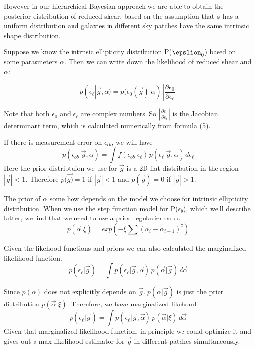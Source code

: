 \documentclass[useAMS,usenatbib]{mn2e}
\begin{document}
However in our hierarchical Bayesian approach we are able to obtain
the posterior distribution of reduced shear, based on the assumption that $\phi$ has
a uniform distribution and galaxies in different sky patches have
the same intrinsic shape distribution.

Suppose we know the intrnsic ellipticity distribution P($\epslion_{0}$)
based on some parasmeters $\alpha$. Then we can write down the likelihood
of reduced shear and $\alpha$:

\begin{equation}
p(\epsilon_{\ell}|\vec{g},\alpha)=p(\epsilon_{0}(\vec{g})|\alpha)\,|\frac{\partial\epsilon_{0}}{\partial\epsilon_{\ell}}|
\end{equation}



Note that both $\epsilon_{0}$ and $\epsilon_{\ell}$ are complex numbers. So
$|\frac{\partial\epsilon_{0}}{\partial\epsilon_{\ell}}|$ is the Jacobian
determinant term, which is calculated numerically from formula
(5).

If there is measurement error on $\epsilon_{ob}$, we will have 
\begin{equation}
p(\epsilon_{ob}|\vec{g},\alpha)=\int f(\epsilon_{ob}|\epsilon_{\ell})\, p(\epsilon_{\ell}|\vec{g},\alpha)\,d\epsilon_{\ell}
\end{equation}
Here the prior distribtuion we use for $\vec{g}$ is a 2D flat distribution
in the region $|\vec{g}|<1$. Therefore $p(\vec{g)}=1$ if $|\vec{g}|<1$
and $p(\vec{g})=0$ if $|\vec{g}|>1$.

The prior of $\alpha$ some how depends on the model we choose for
intrinsic ellipticity distribution. When we use the step function
model for P($\epsilon_{0}$), which we'll describe latter, we find that
we need to use a prior regulazier on $\alpha$. 
\begin{equation}
p(\vec{\alpha}|\xi)=exp(-\xi\sum(\alpha_{i}-\alpha_{i-1})^{2})
\end{equation}

Given the likehood functions and priors we can also calculated the marginalized likelihood function. 
\begin{equation}
p(\epsilon_{\ell}|\vec{g})=\int p(\epsilon_{\ell}|\vec{g},\vec{\alpha})\,p(\vec{\alpha}|\vec{g})\,d\vec{\alpha}
\end{equation}

Since $p(\alpha)$ does not explicitly depends on $\vec{g}$. $p(\alpha|\vec{g})$ is
just the prior distribution $p(\vec{\alpha}|\xi)$. Therefore, we have
marginalized likehood 
\begin{equation}
p(\epsilon_{\ell}|\vec{g})=\int p(\epsilon_{\ell}|\vec{g},\vec{\alpha})\, p(\vec{\alpha}|\xi)\,d\vec{\alpha}
\end{equation}
Given that marginalized likelihood function, in principle we could optimize it and gives out a max-likelihood estimator for $\vec{g}$
in different patches simultaneously.
\end{document}
